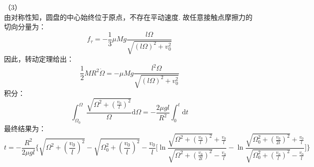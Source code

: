 \documentclass{ctexart}
\begin{document}
\noindent （3）\\
由对称性知，圆盘的中心始终位于原点，不存在平动速度. 故任意接触点摩擦力的切向分量为：
\begin{equation}
  f_{\tau}=-\frac{1}{3}\mu Mg\frac{l\varOmega}{\sqrt{(l\varOmega)^2+v_0^2}} \tag{6.19}
\end{equation}
因此，转动定理给出：
\begin{equation}
  \displaystyle\frac{1}{2}MR^2\dot{\varOmega}=-\mu Mg\frac{l^2\varOmega}{\sqrt{(l\varOmega)^2+v_0^2}}\tag{6.20}
\end{equation}
积分：
\begin{equation}
  \displaystyle \int_{\varOmega_0}^{\varOmega}\frac{\sqrt{\varOmega^2+(\frac{v_0}{l})^2}}{\varOmega}\mathrm{d}\varOmega=-\frac{2\mu gl}{R^2}\int_0^t\mathrm{d}t \tag{6.21}
\end{equation}
最终结果为：
\begin{equation}
  t=-\displaystyle\frac{R^2}{2\mu gl}\Big\{\sqrt{\varOmega^2+(\frac{v_0}{l})^2}-\sqrt{\varOmega_0^2+(\frac{v_0}{l})^2}-\frac{v_0}{l}\Big[ \ln{\frac{\sqrt{\varOmega^2+(\frac{v_0}{l})^2}+\frac{v_0}{l}}{\sqrt{\varOmega^2+(\frac{v_0}{2l})^2}-\frac{v_0}{l}}}-\ln{\frac{\sqrt{\varOmega_0^2+(\frac{v_0}{2l})^2}+\frac{v_0}{l}}{\sqrt{\varOmega_0^2+(\frac{v_0}{l})^2}-\frac{v_0}{l}}}\Big]\Big\} \tag{6.22}
\end{equation}

\clearpage
\end{document}
